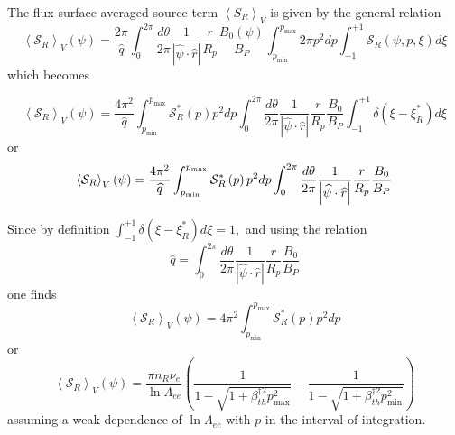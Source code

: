 The flux-surface averaged source term $\left\langle S_{R}\right\rangle _{V}$
is given by the general relation
\begin{equation}
\left\langle \mathcal{S}_{R}\right\rangle _{V}\left( \psi \right) =\frac{
2\pi }{\widehat{q}}\int_{0}^{2\pi }\frac{d\theta }{2\pi }\frac{1}{\left|
\widehat{\psi }\cdot \widehat{r}\right| }\frac{r}{R_{p}}\frac{B_{0}\left(
\psi \right) }{B_{P}}\int_{p_{\min }}^{p_{\max }}2\pi p^{2}dp\int_{-1}^{+1}%
\mathcal{S}_{R}\left( \psi ,p,\xi \right) d\xi
\end{equation}
which becomes

\begin{equation}
\left\langle \mathcal{S}_{R}\right\rangle _{V}\left( \psi \right) =\frac{
4\pi ^{2}}{\widehat{q}}\int_{p_{\min }}^{p_{\max }}\mathcal{S}_{R}^{*}\left(
p\right) p^{2}dp\int_{0}^{2\pi }\frac{d\theta }{2\pi }\frac{1}{\left|
\widehat{\psi }\cdot \widehat{r}\right| }\frac{r}{R_{p}}\frac{B_{0}}{B_{P}}
\int_{-1}^{+1}\delta \left( \xi -\xi _{R}^{*}\right) d\xi
\end{equation}
or
\begin{equation}
\left\langle \mathcal{S}_{R}\right\rangle _{V}\left( \psi \right) =\frac{%
4\pi ^{2}}{\widehat{q}}\int_{p_{\min }}^{p_{\max }}\mathcal{S}_{R}^{*}\left(
p\right) p^{2}dp\int_{0}^{2\pi }\frac{d\theta }{2\pi }\frac{1}{\left|
\widehat{\psi }\cdot \widehat{r}\right| }\frac{r}{R_{p}}\frac{B_{0}}{B_{P}}
\end{equation}

Since by definition $\int_{-1}^{+1}\delta \left( \xi -\xi _{R}^{*}\right)
d\xi =1,$ and using the relation
\begin{equation}
\widehat{q}=\int_{0}^{2\pi }\frac{d\theta }{2\pi }\frac{1}{\left| \widehat{
\psi }\cdot \widehat{r}\right| }\frac{r}{R_{p}}\frac{B_{0}}{B_{P}}
\end{equation}
one finds
\begin{equation}
\left\langle \mathcal{S}_{R}\right\rangle _{V}\left( \psi \right) =4\pi
^{2}\int_{p_{\min }}^{p_{\max }}\mathcal{S}_{R}^{*}\left( p\right) p^{2}dp
\end{equation}
or
\begin{equation}
\left\langle \mathcal{S}_{R}\right\rangle _{V}\left( \psi \right) =\frac{\pi
n_{R}\nu _{e}}{\ln \Lambda _{ee}}\left( \frac{1}{1-\sqrt{1+\beta _{th}^{\dag
2}p_{\max }^{2}}}-\frac{1}{1-\sqrt{1+\beta _{th}^{\dag 2}p_{\min }^{2}}}
\right)
\end{equation}
assuming a weak dependence of $\ln \Lambda _{ee}$ with $p$ in the interval
of integration.

